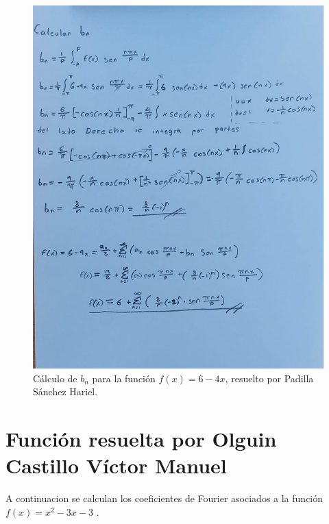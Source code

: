 {%
    \begin{figure}[H]
        \centering
        \includegraphics[width=\linewidth]{Figures/fourierHariel/fase1/funcion 2.jpg}
        \caption[Cálculo de \(b_n\) para \(f(x) = 6 - 4x\)]{Cálculo de \(b_n\) para la función \(f(x) = 6 - 4x\), resuelto por Padilla Sánchez Hariel.}
        \label{fig:figure-hariel-02}
    \end{figure}

\section{Función resuelta por Olguin Castillo Víctor Manuel }
    A continuacion se calculan los coeficientes de Fourier asociados a la función \(f(x)=x^2-3x-3\) . 

}

